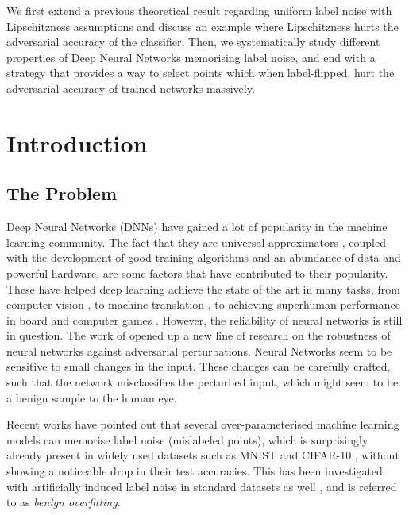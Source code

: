 \documentclass{ociamthesis}
\begin{document}
We first extend a previous theoretical result regarding uniform label noise with
Lipschitzness assumptions and discuss an example where Lipschitzness hurts the
adversarial accuracy of the classifier. Then, we systematically study different
properties of Deep Neural Networks memorising label noise, and end with a
strategy that provides a way to select points which when label-flipped, hurt the
adversarial accuracy of trained networks massively.

\tableofcontents

\chapter{Introduction}

\section{The Problem}

Deep Neural Networks (DNNs) have gained a lot of popularity in the machine
learning community. The fact that they are universal approximators
\citep{hornik1989multilayer}, coupled with the development of good training
algorithms and an abundance of data and powerful hardware, are some factors that
have contributed to their popularity. These have helped deep learning achieve
the state of the art in many tasks, from computer vision \citep{imagenet}, to
machine translation \citep{seq2seq,attention-is-all-you-need}, to achieving
superhuman performance in board and computer games \citep{alpha-zero,
starcraft}. However, the reliability of neural networks is still in question.
The work of \citet{42503} opened up a new line of research on the robustness of
neural networks against adversarial perturbations. Neural Networks seem to be
sensitive to small changes in the input. These changes can be carefully crafted,
such that the network misclassifies the perturbed input, which might seem to be
a benign sample to the human eye.

Recent works \citep{belkin2018understand,DBLP:journals/cacm/ZhangBHRV21} have
pointed out that several over-parameterised machine learning models can memorise
label noise (mislabeled points), which is surprisingly already present in widely
used datasets \citep{sanyal2021how} such as MNIST
\citep{lecun-mnisthandwrittendigit-2010} and CIFAR-10
\citep{Krizhevsky09learningmultiple}, without showing a noticeable drop in their
test accuracies. This has been investigated with artificially induced label
noise in standard datasets as well \citep{DBLP:journals/cacm/ZhangBHRV21}, and
is referred to as \emph{benign overfitting}.
\end{document}
